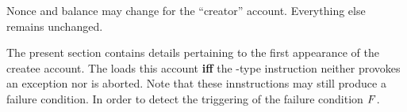 \saNote{} Nonce and balance may change for the ``creator'' account. Everything else remains unchanged.
\begin{center}
\end{center}
The present section contains details pertaining to the first appearance of the createe account.
The \zkEvm{} loads this account \textbf{iff} the -type instruction neither provokes an exception nor is aborted.
Note that these innstructions may still produce a failure condition.
In order to detect the triggering of the failure condition $F$.
